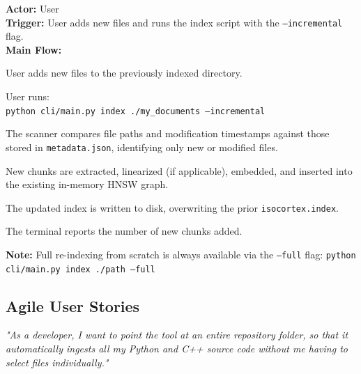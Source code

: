 \documentclass[12pt, a4paper]{article}
\begin{document}
\begin{tcolorbox}[enhanced, colback=white, colframe=ctPurple,
    colbacktitle=ctLightPurple, coltitle=ctPurple, boxrule=0.5pt,
    leftrule=4pt, arc=2mm, fonttitle=\large\bfseries,
    title={UC-3: Incremental Re-Indexing},
    drop fuzzy shadow=black!5!white, top=2pt, bottom=2pt]
\textbf{Actor:} User \\[4pt]
\textbf{Trigger:} User adds new files and runs the index script with the
\texttt{--incremental} flag. \\[4pt]
\textbf{Main Flow:}
\begin{trellolist}
    \item User adds new files to the previously indexed directory.
    \item User runs:\\
    \texttt{python cli/main.py index ./my\_documents --incremental}
    \item The scanner compares file paths and modification timestamps
    against those stored in \texttt{metadata.json}, identifying only new
    or modified files.
    \item New chunks are extracted, linearized (if applicable), embedded,
    and inserted into the existing in-memory HNSW graph.
    \item The updated index is written to disk, overwriting the prior
    \texttt{isocortex.index}.
    \item The terminal reports the number of new chunks added.
\end{trellolist}
\textbf{Note:} Full re-indexing from scratch is always available via the
\texttt{--full} flag:
\texttt{python cli/main.py index ./path --full}
\end{tcolorbox}

\subsection{Agile User Stories}
\vspace{0.3cm}

\begin{tcolorbox}[enhanced, colback=white, colframe=ctGold, colbacktitle=ctLightGold, coltitle=ctPurple, boxrule=0.5pt, leftrule=4pt, arc=2mm, fonttitle=\large\bfseries, title={US-1: Bulk Directory Scan}, drop fuzzy shadow=black!5!white, top=2pt, bottom=2pt]
\textit{"As a developer, I want to point the tool at an entire repository folder, so that it automatically ingests all my Python and C++ source code without me having to select files individually."}
\end{tcolorbox}
\end{document}

